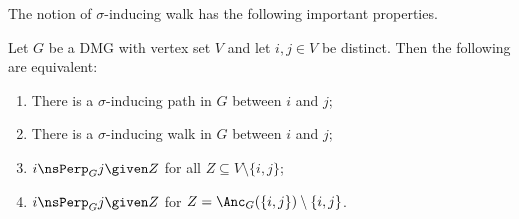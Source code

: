 The notion of $\sigma$-inducing walk has the following important properties.
\begin{Prp}\label{prp:sigma-inducing_path_properties}
  Let $G$ be a DMG with vertex set $V$ and let $i,j \in V$ be distinct. Then the following are equivalent:
  \begin{enumerate}[label=(\roman*)]
    \item There is a $\sigma$-inducing path in $G$ between $i$ and $j$;
    \item There is a $\sigma$-inducing walk in $G$ between $i$ and $j$;
    \item $i \nsPerp_G j \given Z$ for all $Z \subseteq V \setminus \{i,j\}$;
    \item $i \nsPerp_G j \given Z$ for $Z = \Anc_G(\{i,j\}) \setminus \{i,j\}$.
  \end{enumerate}
\end{Prp}
